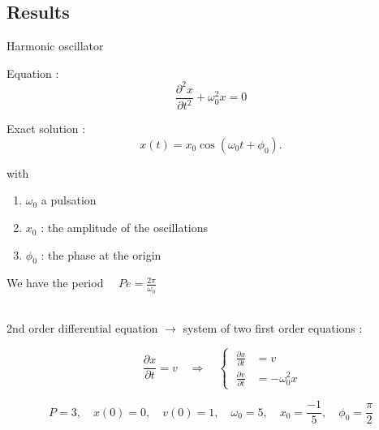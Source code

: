 \subsection{Results}

\begin{frame}[allowframebreaks]{Harmonic oscillator}
	\begin{minipage}{0.48\linewidth}
		Equation :
		$$\frac{\partial^2 x}{\partial t^2}+\omega_0^2 x = 0$$
	\end{minipage}
	\begin{minipage}{0.48\linewidth}
		Exact solution :
		$$x(t) = x_0 \cos(\omega_{0}t+\phi_0).$$ 
	\end{minipage}	
	with
	\begin{enumerate}[\textbullet]
		\item $\omega_0$ a pulsation
		\item $x_0$ : the amplitude of the oscillations
		\item $\phi_0$ : the phase at the origin
	\end{enumerate}
	We have the period $\quad Pe=\frac{2\pi}{\omega_0}$

	\; \\
	
	2nd order differential equation $\rightarrow$ system of two first order equations :
		
	$$\qquad \frac{\partial x}{\partial t}=v \quad \Rightarrow \quad \left\{\;\begin{aligned}
		\frac{\partial x}{\partial t}&=v \\
		\frac{\partial v}{\partial t}&=-\omega_0^2 x
	\end{aligned}\right.
	$$  
	
	\newpage
	
	$$P=3, \quad x(0)=0,\quad v(0)=1, \quad\omega_0=5, \quad x_0=\frac{-1}{5}, \quad \phi_0=\frac{\pi}{2}$$
	

\end{frame}
